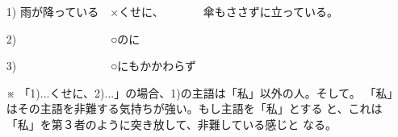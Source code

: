 \documentclass[
uplatex,
b5paper,
10pt,
dvipdfmx
]{jsbook}
\begin{document}
\begin{enumerate}
\begin{itemize}
\item[1)] 雨が降っている　×くせに、　　　　傘もささずに立っている。
\item[2)] 　　　　　　　　○のに
\item[3)] 　　　　　　　　○にもかかわらず
\end{itemize}

\begin{itemize}
\item[※] 「1)...くせに、2)...」の場合、1)の主語は「私」以外の人。そして。
	  「私」はその主語を非難する気持ちが強い。もし主語を「私」とする
	  と、これは「私」を第３者のように突き放して、非難している感じと
	  なる。
\end{itemize}
\end{enumerate}

\end{document}

